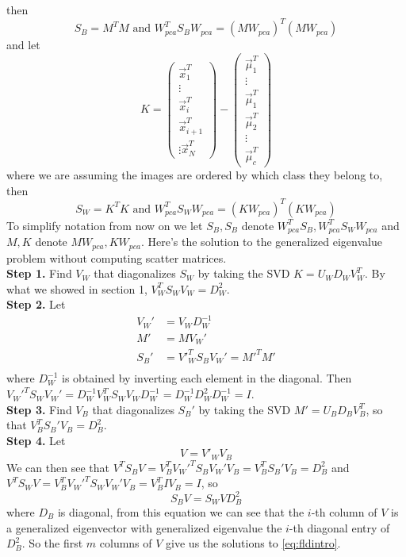 \documentclass{amsart}
\theoremstyle{definition}
\theoremstyle{remark}
\begin{document}
then 
$$S_B = M^TM\text{ and } W_{pca}^TS_BW_{pca} = (MW_{pca})^T(MW_{pca}) $$
and let 
$$K = \begin{pmatrix} \vec{x}_1^T \\\vdots \\ \vec{x}_i^T\\\vec{x}_{i+1}^T\\\vdots \vec{x}_N^T\end{pmatrix} - \begin{pmatrix}\vec{\mu}_1^T \\\vdots\\\vec{\mu}_1^T\\\vec{\mu}_2^T\\\vdots\\\vec{\mu}_c^T\end{pmatrix} $$
where we are assuming the images are ordered by which class they belong to, then
$$S_W = K^TK \text{ and } W_{pca}^TS_WW_{pca} = (KW_{pca})^T(KW_{pca})$$
To simplify notation from now on we let $S_B, S_B$ denote $W_{pca}^TS_B, W_{pca}^TS_WW_{pca}$ and $M,K$ denote $MW_{pca}, KW_{pca}$. 
Here's the solution to the generalized eigenvalue problem without computing scatter matrices. \\
\textbf{Step 1. }Find $V_W$ that diagonalizes $S_W$ by taking the SVD $K = U_W D_W V_W^T$. By what we showed in section 1, $V_W^T S_W V_W = D_W^2$.\\
\textbf{Step 2. }Let 
\begin{align*}
	V_W' &= V_W D_W^{-1}\\ 
	M' &= MV_W'\\
	S_B' &= V'_W^TS_BV_W' = M'^TM'\\
\end{align*}
where $D_W^{-1}$ is obtained by inverting each element in the diagonal. Then $V_W'^T S_W V_W' = D_W^{-1}V_W^TS_WV_WD_W^{-1} = D_W^{-1} D_W^2 D_W^{-1} = I$. \\
\textbf{Step 3. }Find $V_B$ that diagonalizes $S_B'$ by taking the SVD $M' = U_B D_B V_B^T$, so that $V_B^TS_B' V_B = D_B^2$. \\
\textbf{Step 4. }Let $$V = V'_W V_B$$
We can then see that $V^TS_BV = V_B^TV_W'^T S_B V_W'V_B = V_B^TS_B'V_B = D_B^2$ and $V^TS_WV = V_B^TV_W'^T S_W V_W'V_B = V_B^TIV_B = I$, so 
$$S_BV = S_WVD_B^2$$
where $D_B$ is diagonal, from this equation we can see that the $i$-th column of $V$ is a generalized eigenvector with generalized eigenvalue the $i$-th diagonal entry of $D_B^2$. So the first $m$ columns of $V$ give us the solutions to \ref{eq:fldintro}.
\end{document}

